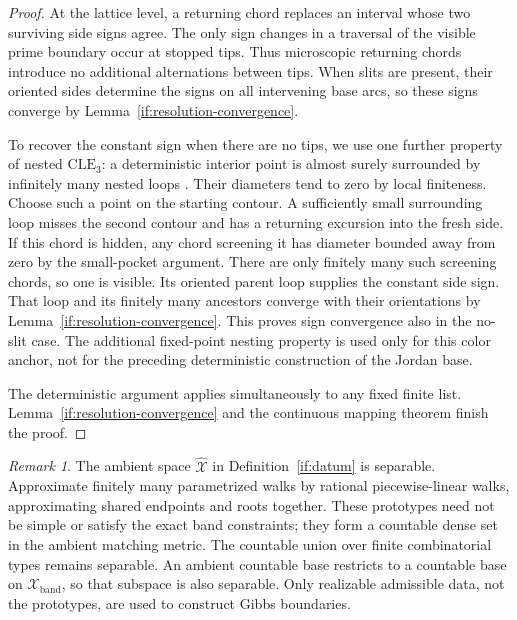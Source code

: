 \documentclass[11pt]{article}
\theoremstyle{definition}
\theoremstyle{remark}
\newtheorem{remark}[theorem]{Remark}
\numberwithin{equation}{section}
\begin{document}
\begin{proof}
At the lattice level, a returning chord replaces an interval whose
two surviving side signs agree.  The only sign changes in a traversal
of the visible prime boundary occur at stopped tips.  Thus microscopic
returning chords introduce no additional alternations between tips.
When slits are present, their oriented sides determine the signs on
all intervening base arcs, so these signs converge by
Lemma~\ref{if:resolution-convergence}.

To recover the constant sign when there are no tips, we use one further
property of nested $\mathrm{CLE}_3$: a deterministic interior point is
almost surely surrounded by infinitely many nested loops
\cite[Section~1, before Proposition~1]{SSW2009}. Their diameters tend to
zero by local finiteness. Choose such a point on the starting contour.
A sufficiently small surrounding loop misses the second contour and
has a returning excursion into the fresh side. If this chord is hidden,
any chord screening it has diameter bounded away from zero by the
small-pocket argument. There are only finitely many such screening
chords, so one is visible. Its oriented parent loop supplies the constant
side sign. That loop and its finitely many ancestors converge with their
orientations by Lemma~\ref{if:resolution-convergence}. This proves sign
convergence also in the no-slit case. The additional fixed-point nesting
property is used only for this color anchor, not for the preceding
deterministic construction of the Jordan base.

The deterministic argument applies simultaneously to any fixed finite
list.  Lemma~\ref{if:resolution-convergence} and the continuous mapping
theorem finish the proof.
\end{proof}

\begin{remark}\label{if:metric-separable}
The ambient space $\widehat{\mathcal X}$ in Definition~\ref{if:datum}
is separable. Approximate finitely many parametrized walks by rational
piecewise-linear walks, approximating shared endpoints and roots
together. These prototypes need not be simple or satisfy the exact
band constraints; they form a countable dense set in the ambient
matching metric. The countable union over finite combinatorial types
remains separable. An ambient countable base restricts to a countable
base on $\mathcal X_{\mathrm{band}}$, so that subspace is also
separable. Only realizable admissible data, not the prototypes, are
used to construct Gibbs boundaries.
\end{remark}
\end{document}
